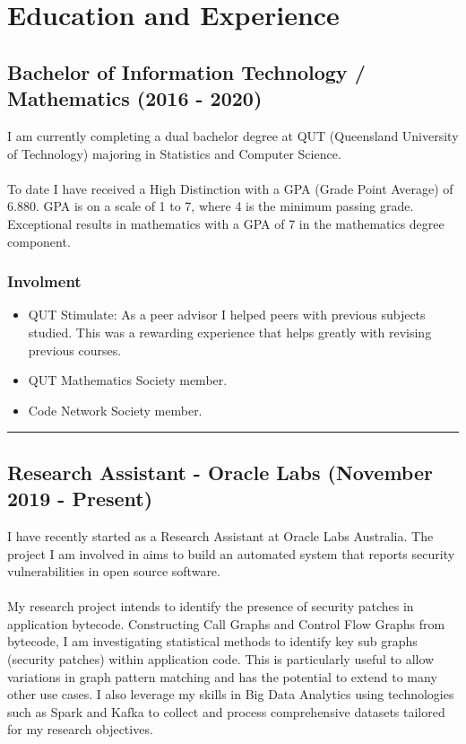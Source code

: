\section*{Education and Experience}
\subsection*{Bachelor of Information Technology / Mathematics (2016 - 2020)}

I am currently completing a dual bachelor degree at QUT (Queensland University of Technology) majoring in Statistics and Computer Science.\\
\\
To date I have received a High Distinction with a GPA (Grade Point Average) of 6.880. GPA is on a scale of 1 to 7, where 4 is the minimum passing grade. Exceptional results in mathematics with a GPA of 7 in the mathematics degree component.

\subsubsection*{Involment}

\begin{itemize}
  \setlength\itemsep{0.1em}
  \item QUT Stimulate: As a peer advisor I helped peers with previous subjects studied. This was a rewarding experience that helps greatly with revising previous courses.
  \item QUT Mathematics Society member.
  \item Code Network Society member.
\end{itemize}

\noindent\rule{\textwidth}{0.5pt}

\subsection*{Research Assistant - Oracle Labs (November 2019 - Present)}

I have recently started as a Research Assistant at Oracle Labs Australia. The project I am involved in aims to build an automated system that reports security vulnerabilities in open source software.\\
\\
My research project intends to identify the presence of security patches in application bytecode. Constructing Call Graphs and Control Flow Graphs from bytecode, I am investigating statistical methods to identify key sub graphs (security patches) within application code. This is particularly useful to allow variations in graph pattern matching and has the potential to extend to many other use cases. I also leverage my skills in Big Data Analytics using technologies such as Spark and Kafka to collect and process comprehensive datasets tailored for my research objectives.

